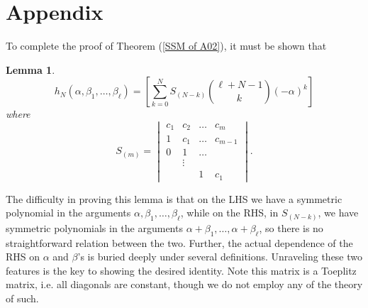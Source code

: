 \documentclass[11pt]{article}
\theoremstyle{plain}
\newtheorem{lemma}[fact]{Lemma}
\theoremstyle{definition}
\theoremstyle{definition}
\newcounter{equation}
\begin{document}
\newpage
\appendix
\section{Appendix}

To complete the proof of Theorem (\ref{SSM of A02}), it must be shown that 

\begin{lemma}\label{last-step}
\begin{equation}
h_N(\alpha,\beta_1,\dots,\beta_\ell) = \left[\sum_{k=0}^NS_{(N-k)}{\ell+N-1\choose k}(-\alpha)^k\right]
\end{equation}
where
\[
S_{(m)} = \begin{vmatrix}c_1 & c_2 & \dots&c_{m}\\ 1 & c_1 & \dots&c_{m-1}\\0&1&\dots\\ & \vdots & \\
&&1&c_1\end{vmatrix}.
\]
\end{lemma}
The difficulty in proving this lemma is that on the LHS we have a symmetric polynomial in the arguments $\alpha,\beta_1,\dots,\beta_\ell$, while on the RHS, in $S_{(N-k)}$, we have symmetric polynomials in the arguments $\alpha+\beta_1,\dots,\alpha+\beta_\ell$, so there is no straightforward relation between the two. Further, the actual dependence of the RHS on $\alpha$ and $\beta$'s is buried deeply under several definitions. Unraveling these two features is the key to showing the desired identity. Note this matrix is a Toeplitz matrix, i.e. all diagonals are constant, though we do not employ any of the theory of such.
\end{document}
